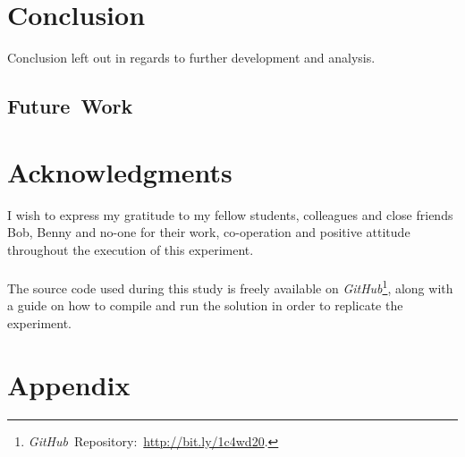 \documentclass[fleqn,10pt]{SelfArx} %
\newlength{\tocsep}
\begin{document}

\section{Conclusion}
\label{sec:conclusion}
Conclusion left out in regards to further development and analysis.

\subsection{Future~Work}
\label{sec:conclusion:futurework}

\section*{Acknowledgments} %
\label{sec:acknowledgments}
I wish to express my gratitude to my fellow students, colleagues and close friends Bob, Benny and no-one for their work, co-operation and positive attitude throughout the execution of this experiment. \\
\\
The source code used during this study is freely available on \textit{GitHub}\footnote{\textit{GitHub}~Repository:~\url{http://bit.ly/1c4wd20}.}, along with a guide on how to compile and run the solution in order to replicate the experiment.

\section*{Appendix}
\label{sec:appendix}
\end{document}
